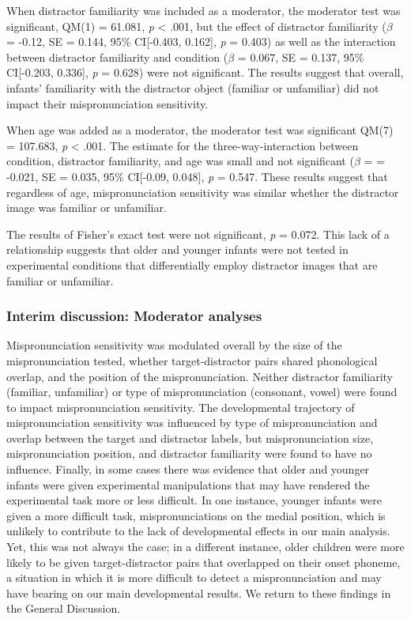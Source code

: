 \documentclass[man]{apa6}
\begin{document}
When distractor familiarity was included as a moderator, the moderator test was significant, QM(1) = 61.081, \emph{p} \textless{} .001, but the effect of distractor familiarity (\(\beta\) = -0.12, SE = 0.144, 95\% CI{[}-0.403, 0.162{]}, \emph{p} = 0.403) as well as the interaction between distractor familiarity and condition (\(\beta\) = 0.067, SE = 0.137, 95\% CI{[}-0.203, 0.336{]}, \emph{p} = 0.628) were not significant. The results suggest that overall, infants' familiarity with the distractor object (familiar or unfamiliar) did not impact their mispronunciation sensitivity.

When age was added as a moderator, the moderator test was significant QM(7) = 107.683, \emph{p} \textless{} .001. The estimate for the three-way-interaction between condition, distractor familiarity, and age was small and not significant (\(\beta\) = = -0.021, SE = 0.035, 95\% CI{[}-0.09, 0.048{]}, \emph{p} = 0.547. These results suggest that regardless of age, mispronunciation sensitivity was similar whether the distractor image was familiar or unfamiliar.

The results of Fisher's exact test were not significant, \emph{p} = 0.072. This lack of a relationship suggests that older and younger infants were not tested in experimental conditions that differentially employ distractor images that are familiar or unfamiliar.

\hypertarget{interim-discussion-moderator-analyses}{%
\subsubsection{Interim discussion: Moderator analyses}\label{interim-discussion-moderator-analyses}}

Mispronunciation sensitivity was modulated overall by the size of the mispronunciation tested, whether target-distractor pairs shared phonological overlap, and the position of the mispronunciation. Neither distractor familiarity (familiar, unfamiliar) or type of mispronunciation (consonant, vowel) were found to impact mispronunciation sensitivity. The developmental trajectory of mispronunciation sensitivity was influenced by type of mispronunciation and overlap between the target and distractor labels, but mispronunciation size, mispronunciation position, and distractor familiarity were found to have no influence. Finally, in some cases there was evidence that older and younger infants were given experimental manipulations that may have rendered the experimental task more or less difficult. In one instance, younger infants were given a more difficult task, mispronunciations on the medial position, which is unlikely to contribute to the lack of developmental effects in our main analysis. Yet, this was not always the case; in a different instance, older children were more likely to be given target-distractor pairs that overlapped on their onset phoneme, a situation in which it is more difficult to detect a mispronunciation and may have bearing on our main developmental results. We return to these findings in the General Discussion.
\end{document}
